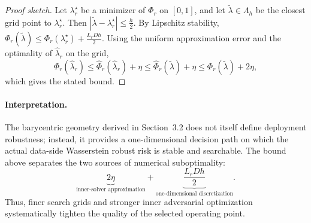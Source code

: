 \begin{proof}[Proof sketch]
Let $\lambda_r^\star$ be a minimizer of $\Phi_r$ on $[0,1]$, and let
$\widetilde\lambda\in\Lambda_h$ be the closest grid point to
$\lambda_r^\star$. Then
$
|\widetilde\lambda-\lambda_r^\star|
\le
\frac h2.
$
By Lipschitz stability,
$
\Phi_r(\widetilde\lambda)
\le
\Phi_r(\lambda_r^\star)
+
\frac{L_rDh}{2}.
$
Using the uniform approximation error and the optimality of
$\widehat\lambda_r$ on the grid,
\[
\Phi_r(\widehat\lambda_r)
\le
\widehat\Phi_r(\widehat\lambda_r)+\eta
\le
\widehat\Phi_r(\widetilde\lambda)+\eta
\le
\Phi_r(\widetilde\lambda)+2\eta,
\]
which gives the stated bound.\end{proof}

\paragraph{Interpretation.}
The barycentric geometry derived in Section~3.2 does not itself define
deployment robustness; instead, it provides a one-dimensional decision
path on which the actual data-side Wasserstein robust risk is stable and
searchable. The bound above separates the two sources of numerical
suboptimality:
\[
\underbrace{2\eta}_{\text{inner-solver approximation}}
+
\underbrace{\frac{L_rDh}{2}}_{\text{one-dimensional discretization}}.
\]
Thus, finer search grids and stronger inner adversarial optimization
systematically tighten the quality of the selected operating point.
 \fi


